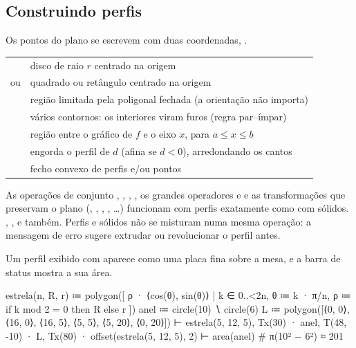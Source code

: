 \subsection{Construindo perfis}
Os pontos do plano se escrevem com duas coordenadas, .
\begin{longtable}{@{}L{0.36}L{0.64}@{}}
\toprule
{} &  \\
\midrule
{} & disco de raio $r$ centrado na origem \\
 ou  & quadrado ou retângulo centrado na origem \\
 & região limitada pela poligonal fechada (a orientação não importa) \\
 & vários contornos: os interiores viram furos (regra par–ímpar) \\
 & região entre o gráfico de $f$ e o eixo $x$, para $a \le x \le b$ \\
 & engorda o perfil de $d$ (afina se $d < 0$), arredondando os cantos \\
 & fecho convexo de perfis e/ou pontos  \\
\bottomrule
\end{longtable}
As operações de conjunto , , , , os grandes operadores  e  e as
transformações que preservam o plano (, , , , …) funcionam com perfis
exatamente como com sólidos. , ,  e  também. Perfis e sólidos não se
misturam numa mesma operação: a mensagem de erro sugere extrudar ou revolucionar o perfil antes.

Um perfil exibido com  aparece como uma placa fina sobre a mesa, e a barra de status mostra a sua área.
\begin{csg}[run, id=perfis]
estrela(n, R, r) ≔ polygon([ ρ · ⟨cos(θ), sin(θ)⟩
                     | k ∈ 0..<2n, θ ≔ k · π/n, ρ ≔ if k mod 2 = 0 then R else r ])
anel ≔ circle(10) ∖ circle(6)
L ≔ polygon([⟨0, 0⟩, ⟨16, 0⟩, ⟨16, 5⟩, ⟨5, 5⟩, ⟨5, 20⟩, ⟨0, 20⟩])
⊢ estrela(5, 12, 5), Tx(30) · anel, T(48, -10) · L, Tx(80) · offset(estrela(5, 12, 5), 2)
⊢ area(anel)            # π(10² − 6²) ≈ 201
\end{csg}

